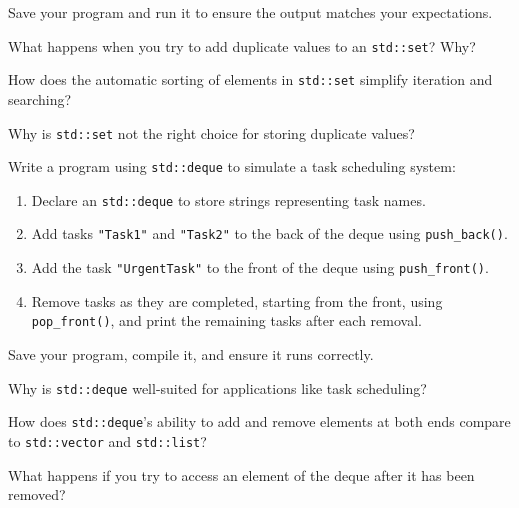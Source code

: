 \begin{challenge}
\begin{task}
        Save your program and run it to ensure the output matches your expectations.

        \begin{questions}
            \item What happens when you try to add duplicate values to an \texttt{std::set}? Why?
            \item How does the automatic sorting of elements in \texttt{std::set} simplify iteration and searching?
            \item Why is \texttt{std::set} not the right choice for storing duplicate values?
        \end{questions}
    \end{task}

    \begin{task}
        Write a program using \texttt{std::deque} to simulate a task scheduling system:
        \begin{enumerate}
            \item Declare an \texttt{std::deque} to store strings representing task names.
            \item Add tasks \texttt{"Task1"} and \texttt{"Task2"} to the back of the deque using \texttt{push\_back()}.
            \item Add the task \texttt{"UrgentTask"} to the front of the deque using \texttt{push\_front()}.
            \item Remove tasks as they are completed, starting from the front, using \texttt{pop\_front()}, and print the remaining tasks after each removal.
        \end{enumerate}

        Save your program, compile it, and ensure it runs correctly.

        \begin{questions}
            \item Why is \texttt{std::deque} well-suited for applications like task scheduling?
            \item How does \texttt{std::deque}'s ability to add and remove elements at both ends compare to \texttt{std::vector} and \texttt{std::list}?
            \item What happens if you try to access an element of the deque after it has been removed?
        \end{questions}
    \end{task}


\end{challenge}
